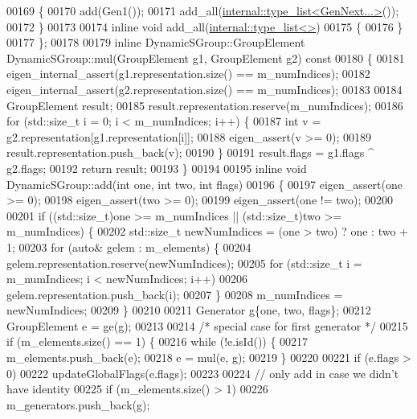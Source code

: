 \begin{DoxyCode}
00169     \{
00170       add(Gen1());
00171       add\_all(\hyperlink{struct_eigen_1_1internal_1_1type__list}{internal::type\_list<GenNext...>}());
00172     \}
00173 
00174     \textcolor{keyword}{inline} \textcolor{keywordtype}{void} add\_all(\hyperlink{struct_eigen_1_1internal_1_1type__list}{internal::type\_list<>})
00175     \{
00176     \}
00177 \};
00178 
00179 \textcolor{keyword}{inline} DynamicSGroup::GroupElement DynamicSGroup::mul(GroupElement g1, GroupElement g2)\textcolor{keyword}{ const}
00180 \textcolor{keyword}{}\{
00181   eigen\_internal\_assert(g1.representation.size() == m\_numIndices);
00182   eigen\_internal\_assert(g2.representation.size() == m\_numIndices);
00183 
00184   GroupElement result;
00185   result.representation.reserve(m\_numIndices);
00186   \textcolor{keywordflow}{for} (std::size\_t i = 0; i < m\_numIndices; i++) \{
00187     \textcolor{keywordtype}{int} v = g2.representation[g1.representation[i]];
00188     eigen\_assert(v >= 0);
00189     result.representation.push\_back(v);
00190   \}
00191   result.flags = g1.flags ^ g2.flags;
00192   \textcolor{keywordflow}{return} result;
00193 \}
00194 
00195 \textcolor{keyword}{inline} \textcolor{keywordtype}{void} DynamicSGroup::add(\textcolor{keywordtype}{int} one, \textcolor{keywordtype}{int} two, \textcolor{keywordtype}{int} flags)
00196 \{
00197   eigen\_assert(one >= 0);
00198   eigen\_assert(two >= 0);
00199   eigen\_assert(one != two);
00200 
00201   \textcolor{keywordflow}{if} ((std::size\_t)one >= m\_numIndices || (std::size\_t)two >= m\_numIndices) \{
00202     std::size\_t newNumIndices = (one > two) ? one : two + 1;
00203     \textcolor{keywordflow}{for} (\textcolor{keyword}{auto}& gelem : m\_elements) \{
00204       gelem.representation.reserve(newNumIndices);
00205       \textcolor{keywordflow}{for} (std::size\_t i = m\_numIndices; i < newNumIndices; i++)
00206         gelem.representation.push\_back(i);
00207     \}
00208     m\_numIndices = newNumIndices;
00209   \}
00210 
00211   Generator g\{one, two, flags\};
00212   GroupElement e = ge(g);
00213 
00214   \textcolor{comment}{/* special case for first generator */}
00215   \textcolor{keywordflow}{if} (m\_elements.size() == 1) \{
00216     \textcolor{keywordflow}{while} (!e.isId()) \{
00217       m\_elements.push\_back(e);
00218       e = mul(e, g);
00219     \}
00220 
00221     \textcolor{keywordflow}{if} (e.flags > 0)
00222       updateGlobalFlags(e.flags);
00223 
00224     \textcolor{comment}{// only add in case we didn't have identity}
00225     \textcolor{keywordflow}{if} (m\_elements.size() > 1)
00226       m\_generators.push\_back(g);

\end{DoxyCode}
